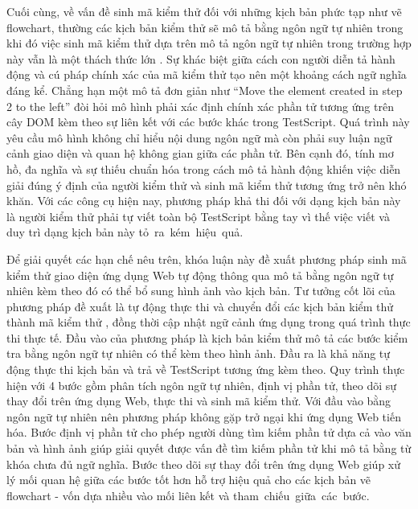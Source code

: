 \documentclass[a4paper, 12pt]{report}
\begin{document}
Cuối cùng, về vấn đề sinh mã kiểm thử đối với những kịch bản phức tạp như vẽ flowchart, thường các kịch bản kiểm thử sẽ mô tả bằng ngôn ngữ tự nhiên trong khi đó việc sinh mã kiểm thử dựa trên mô tả ngôn ngữ tự nhiên trong trường hợp này vẫn là một thách thức lớn \cite{du2025codegragbridginggapnatural}. Sự khác biệt giữa cách con người diễn tả hành động và cú pháp chính xác của mã kiểm thử tạo nên một khoảng cách ngữ nghĩa đáng kể. Chẳng hạn một mô tả đơn giản như ``Move the element created in step 2 to the left'' đòi hỏi mô hình phải xác định chính xác phần tử tương ứng trên cây DOM kèm theo sự liên kết với các bước khác trong \gls{TestScript}. Quá trình này yêu cầu mô hình không chỉ hiểu nội dung ngôn ngữ mà còn phải suy luận ngữ cảnh giao diện và quan hệ không gian giữa các phần tử. Bên cạnh đó, tính mơ hồ, đa nghĩa và sự thiếu chuẩn hóa trong cách mô tả hành động khiến việc diễn giải đúng ý định của người kiểm thử và sinh mã kiểm thử tương ứng trở nên khó khăn. Với các công cụ hiện nay, phương pháp khả thi đối với dạng kịch bản này là người kiểm thử phải tự viết toàn bộ \gls{TestScript} bằng tay vì thế việc viết và duy trì dạng kịch bản này tỏ~ra~kém~hiệu~quả.





Để giải quyết các hạn chế nêu trên, khóa luận này đề xuất phương pháp sinh mã kiểm thử giao diện ứng dụng Web tự động thông qua mô tả bằng ngôn ngữ tự nhiên kèm theo đó có thể bổ sung hình ảnh vào kịch bản. Tư tưởng cốt lõi của phương pháp đề xuất là tự động thực thi và chuyển đổi các kịch bản kiểm thử thành mã kiểm thử , đồng thời cập nhật ngữ cảnh ứng dụng trong quá trình thực thi thực tế. Đầu vào của phương pháp là kịch bản kiểm thử mô tả các bước kiểm tra bằng ngôn ngữ tự nhiên có thể kèm theo hình ảnh. Đầu ra là khả năng tự động thực thi kịch bản và trả về \gls{TestScript} tương ứng kèm theo. Quy trình thực hiện với 4 bước gồm phân tích ngôn ngữ tự nhiên, định vị phần tử, theo dõi sự thay đổi trên ứng dụng Web, thực thi và sinh mã kiểm thử. Với đầu vào bằng ngôn ngữ tự nhiên nên phương pháp không gặp trở ngại khi ứng dụng Web tiến hóa. Bước định vị phần tử cho phép người dùng tìm kiếm phần tử dựa cả vào văn bản và hình ảnh giúp giải quyết được vấn đề tìm kiếm phần tử khi mô tả bằng từ khóa chưa đủ ngữ nghĩa. Bước theo dõi sự thay đổi trên ứng dụng Web giúp xử lý mối quan hệ giữa các bước tốt hơn hỗ trợ hiệu quả cho các kịch bản vẽ flowchart - vốn dựa nhiều vào mối liên kết và tham~chiếu~giữa~các~bước.
\end{document}
